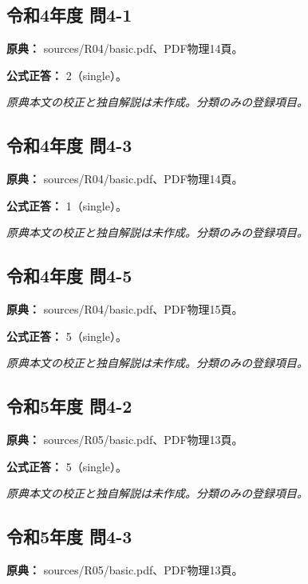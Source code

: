 \subsection{令和4年度 問4-1}
\label{q:r04-reg-basic-4-1}

\noindent\textbf{原典：} sources/R04/basic.pdf、PDF物理14頁。

\textbf{公式正答：} 2（single）。

\par\textit{原典本文の校正と独自解説は未作成。分類のみの登録項目。}

\subsection{令和4年度 問4-3}
\label{q:r04-reg-basic-4-3}

\noindent\textbf{原典：} sources/R04/basic.pdf、PDF物理14頁。

\textbf{公式正答：} 1（single）。

\par\textit{原典本文の校正と独自解説は未作成。分類のみの登録項目。}

\subsection{令和4年度 問4-5}
\label{q:r04-reg-basic-4-5}

\noindent\textbf{原典：} sources/R04/basic.pdf、PDF物理15頁。

\textbf{公式正答：} 5（single）。

\par\textit{原典本文の校正と独自解説は未作成。分類のみの登録項目。}

\subsection{令和5年度 問4-2}
\label{q:r05-reg-basic-4-2}

\noindent\textbf{原典：} sources/R05/basic.pdf、PDF物理13頁。

\textbf{公式正答：} 5（single）。

\par\textit{原典本文の校正と独自解説は未作成。分類のみの登録項目。}

\subsection{令和5年度 問4-3}
\label{q:r05-reg-basic-4-3}

\noindent\textbf{原典：} sources/R05/basic.pdf、PDF物理13頁。

